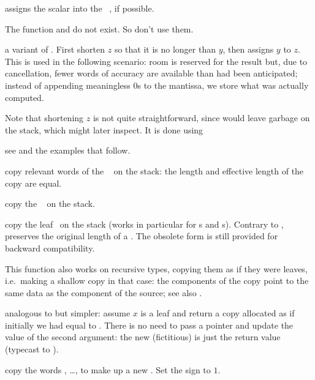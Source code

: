  assigns the scalar  into the
~, if possible.

\noindent The function  and  do not exist. So don't use
them.

 a variant of . First shorten
$z$ so that it is no longer than $y$, then assigns $y$ to $z$. This is used
in the following scenario: room is reserved for the result but, due to
cancellation, fewer words of accuracy are available than had been
anticipated; instead of appending meaningless $0$s to the mantissa, we store
what was actually computed.

Note that shortening $z$ is not quite straightforward, since 
would leave garbage on the stack, which  might later inspect.
It is done using

 see  and the examples that
follow.


 copy relevant words of the ~ on the
stack: the length and effective length of the copy are equal.

 copy the ~ on the stack.

 copy the leaf~ on the
stack (works in particular for s and s).
Contrary to ,  preserves the original
length of a . The obsolete form 
is still provided for backward compatibility.

This function also works on recursive types, copying them as if they were
leaves, i.e.~making a shallow copy in that case: the components of the copy
point to the same data as the component of the source; see also
.

 analogous to 
but simpler: assume $x$ is a leaf and return a copy allocated as if
initially we had  equal to . There is no need to pass a
pointer and update the value of the second argument: the new (fictitious)
 is just the return value (typecast to ).

 copy the  words
, \dots,  to make up a new . Set the sign
to $1$.


